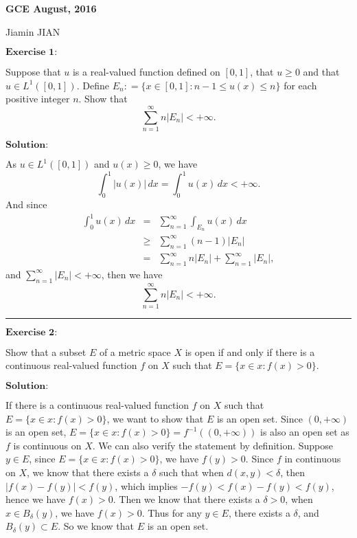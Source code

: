 \documentclass[12pt,a4paper]{ctexart}
\begin{document}
\begin{center}
\textbf{ GCE August, 2016}
\vspace{8pt}

Jiamin JIAN
\end{center}

\vspace{12pt}

$\textbf{Exercise 1:}$

Suppose that $u$ is a real-valued function defined on $[0, 1]$, that $u \geq 0$ and that $u \in L^{1}([0, 1])$. Define $E_{n} : = \{x \in [0, 1]: n - 1 \leq u(x) \leq n \}$ for each positive integer $n$. Show that
\begin{equation*}
    \sum_{n = 1}^{\infty} n |E_{n}| < + \infty.
\end{equation*}

\vspace{8pt}

$\textbf{Solution:}$

As $u \in L^{1}([0, 1])$ and $u(x) \geq 0$, we have
\begin{equation*}
    \int_{0}^{1} |u (x)| \, d x = \int_{0}^{1} u (x) \, d x < + \infty.
\end{equation*}
And since
\begin{eqnarray*}
\int_{0}^{1} u (x) \, d x  & = & \sum_{n = 1}^{\infty} \int_{E_{n}}^{} u(x) \, d x \\
& \geq & \sum_{n = 1}^{\infty} (n -1) |E_{n}| \\
& = & \sum_{n = 1}^{\infty} n |E_{n}| + \sum_{n = 1}^{\infty} |E_{n}|,
\end{eqnarray*}
and $\sum_{n = 1}^{\infty} |E_{n}| < + \infty$, then we have 
\begin{equation*}
    \sum_{n = 1}^{\infty} n |E_{n}| < + \infty.
\end{equation*}


\noindent\rule[0.25\baselineskip]{\textwidth}{0.5pt}

\vspace{8pt}
$\textbf{Exercise 2:}$

Show that a subset $E$ of a metric space $X$ is open if and only if there is a continuous real-valued function $f$ on $X$ such that $E = \{x \in x : f(x) > 0 \}$.
 
\vspace{8pt}
$\textbf{Solution:}$

If there is a continuous real-valued function $f$ on $X$ such that $E = \{x \in x : f(x) > 0 \}$, we want to show that $E$ is an open set. Since $(0, + \infty)$ is an open set, $E = \{x \in x : f(x) > 0 \} = f^{-1} ((0, + \infty))$ is also an open set as $f$ is continuous on $X$. We can also verify the statement by definition. Suppose $y \in E$, since $E = \{x \in x : f(x) > 0 \}$, we have $f(y) > 0$. Since $f$ in continuous on $X$, we know that there exists a $\delta$ such that when $d(x,y) < \delta$, then $|f(x) - f(y)| < f(y)$, which implies $- f(y) < f(x) - f(y) < f(y)$, hence we have $f(x) > 0$. Then we know that there exists a $\delta > 0$, when $x \in B_{\delta} (y)$, we have $f(x) > 0$. Thus for any $y \in E$, there exists a $\delta$, and $B_{\delta} (y) \subset E$. So we know that $E$ is an open set.
\end{document}

